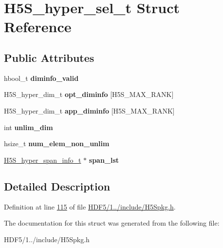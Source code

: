 \hypertarget{struct_h5_s__hyper__sel__t}{}\section{H5\+S\+\_\+hyper\+\_\+sel\+\_\+t Struct Reference}
\label{struct_h5_s__hyper__sel__t}
\subsection*{Public Attributes}
\begin{DoxyCompactItemize}
\item 
\mbox{\label{struct_h5_s__hyper__sel__t_abf131be9b69e5f2fddbb0be2dcb761a8}} 
hbool\+\_\+t {\bfseries diminfo\+\_\+valid}
\item 
\mbox{\label{struct_h5_s__hyper__sel__t_a6a62b3c00f0b411cd62d28c6db688bb3}} 
H5\+S\+\_\+hyper\+\_\+dim\+\_\+t {\bfseries opt\+\_\+diminfo} \mbox{[}H5\+S\+\_\+\+M\+A\+X\+\_\+\+R\+A\+NK\mbox{]}
\item 
\mbox{\label{struct_h5_s__hyper__sel__t_a9ffa3054946b25fb053a4b25544fc722}} 
H5\+S\+\_\+hyper\+\_\+dim\+\_\+t {\bfseries app\+\_\+diminfo} \mbox{[}H5\+S\+\_\+\+M\+A\+X\+\_\+\+R\+A\+NK\mbox{]}
\item 
\mbox{\label{struct_h5_s__hyper__sel__t_aa7cf614647b2767b03206c4bc2abe6c3}} 
int {\bfseries unlim\+\_\+dim}
\item 
\mbox{\label{struct_h5_s__hyper__sel__t_a263456fed6e5a677b482e1041e0d2d54}} 
hsize\+\_\+t {\bfseries num\+\_\+elem\+\_\+non\+\_\+unlim}
\item 
\mbox{\label{struct_h5_s__hyper__sel__t_acea1fd81f69cb223975305557bf79ef8}} 
\hyperlink{struct_h5_s__hyper__span__info__t}{H5\+S\+\_\+hyper\+\_\+span\+\_\+info\+\_\+t} $\ast$ {\bfseries span\+\_\+lst}
\end{DoxyCompactItemize}


\subsection{Detailed Description}


Definition at line \hyperlink{_h_d_f5_21_810_81_2include_2_h5_spkg_8h_source_l00115}{115} of file \hyperlink{_h_d_f5_21_810_81_2include_2_h5_spkg_8h_source}{H\+D\+F5/1../include/\+H5\+Spkg.\+h}.



The documentation for this struct was generated from the following file\+:\begin{DoxyCompactItemize}
\item 
H\+D\+F5/1../include/\+H5\+Spkg.\+h\end{DoxyCompactItemize}
